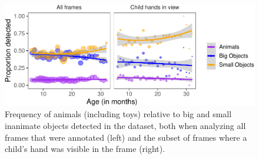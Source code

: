 \documentclass[10pt, letterpaper]{article}
\newenvironment{CodeChunk}{}{}
\begin{document}
\begin{CodeChunk}
\begin{figure}[h]

{\centering \includegraphics{figs/anim_size-1} 

}

\caption[Frequency of animals (including toys) relative to big and small inanimate objects detected in the dataset, both when analyzing all frames that were annotated (left) and the subset of frames where a child's hand was visible in the frame (right)]{Frequency of animals (including toys) relative to big and small inanimate objects detected in the dataset, both when analyzing all frames that were annotated (left) and the subset of frames where a child's hand was visible in the frame (right).}\label{fig:anim_size}
\end{figure}
\end{CodeChunk}
\end{document}
